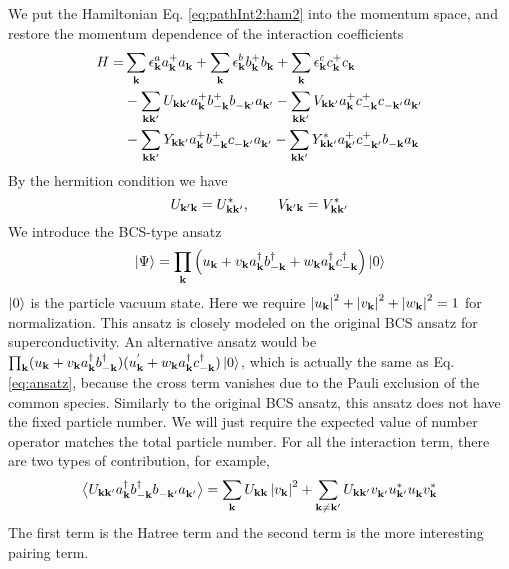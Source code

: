 We put the Hamiltonian Eq. \ref{eq:pathInt2:ham2} into the momentum space, and restore the momentum dependence of the interaction coefficients
\begin{equation}\label{eq:uvw:hamiltonian}
\begin{split}
 H=&\sum_{\mathbf{k}}\epsilon^a_{\mathbf{k}}{}a^+_{\mathbf{k}}{}a^{}_{\mathbf{k}}+\sum_{\mathbf{k}}\epsilon^b_{\mathbf{k}}{}b^+_{\mathbf{k}}{}b^{}_{\mathbf{k}}+\sum_{\mathbf{k}}\epsilon^c_{\mathbf{k}}{}c^+_{\mathbf{k}}{}c^{}_{\mathbf{k}}\\
  &-\sum_{\mathbf{k}\mathbf{k}'}U_{\mathbf{k}\mathbf{k}'}a^+_{\mathbf{k}}{}b^+_{-\mathbf{k}}{}b^{}_{-\mathbf{k}'}a^{}_{\mathbf{k}'}
	-\sum_{\mathbf{k}\mathbf{k}'}V_{\mathbf{k}\mathbf{k}'}a^+_{\mathbf{k}}{}c^+_{-\mathbf{k}}{}c^{}_{-\mathbf{k}'}a^{}_{\mathbf{k}'}\\
 &-\sum_{\mathbf{k}\mathbf{k}'}Y_{\mathbf{k}\mathbf{k}'}a^+_{\mathbf{k}}{}b^+_{-\mathbf{k}}{}c^{}_{-\mathbf{k}'}a^{}_{\mathbf{k}'}
	-\sum_{\mathbf{k}\mathbf{k}'}Y^*_{\mathbf{k}\mathbf{k}'}a^+_{\mathbf{k}'}{}c^+_{-\mathbf{k}'}{}b^{}_{-\mathbf{k}}a^{}_{\mathbf{k}}
\end{split} 
\end{equation}
By the hermition condition we have 
\begin{equation}
 U_{\mathbf{k}'\mathbf{k}}=U^*_{\mathbf{k}\mathbf{k}'},\qquad{} V_{\mathbf{k}'\mathbf{k}}=V^*_{\mathbf{k}\mathbf{k}'}
\end{equation}
  We introduce the BCS-type ansatz 
\begin{equation}\label{eq:ansatz}
 \left|\Psi\right>=\prod_{\mathbf{k}}\left(u_{\mathbf{k}}+v_{\mathbf{k}}{}a^{\dagger}_{\mathbf{k}}{}b^{\dagger}_{-\mathbf{k}}+w_{\mathbf{k}}{}a^{\dagger}_{\mathbf{k}}{}c^{\dagger}_{-\mathbf{k}}\right)\left|0\right>
\end{equation}
$\left|0\right>$ is the particle vacuum state.  Here we require $\left\lvert{u_{\ensuremath{\mathbf{k}}}}\right\rvert^2+\left\lvert{v_{\ensuremath{\mathbf{k}}}}\right\rvert^2+\left\lvert{w_{\ensuremath{\mathbf{k}}}}\right\rvert^2=1$ for normalization.  This ansatz is closely modeled on the original BCS ansatz for superconductivity.  An alternative ansatz would be $\prod_{\mathbf{k}}(u_{\mathbf{k}}+v_{\mathbf{k}}{}a^{\dagger}_{\mathbf{k}}{}b^{\dagger}_{-\mathbf{k}})(u^{'}_{\mathbf{k}}+w_{\mathbf{k}}{}a^{\dagger}_{\mathbf{k}}{}c^{\dagger}_{-\mathbf{k}})\left|0\right>$, which is actually the same as Eq. \ref{eq:ansatz}, because  the cross term vanishes due to the Pauli exclusion of the common species.   Similarly to the original BCS ansatz, this ansatz does not have the fixed particle number.  We  will just require the expected value of number operator matches the total particle number. For all the interaction term, there are two types of contribution,
for example, 
\begin{equation*}
\bigl<{U_{\mathbf{k}\mathbf{k}'}a^{\dagger}_{\mathbf{k}}{}b^{\dagger}_{-\mathbf{k}}{}b^{}_{-\mathbf{k}'}a^{}_{\mathbf{k}'}}\bigr>
=\sum_{\mathbf{k}}U_{\mathbf{k}\mathbf{k}}\left\lvert{v_{\ensuremath{\mathbf{k}}}}\right\rvert^2+\sum_{\mathbf{k}\neq\mathbf{k}'}U_{\mathbf{k}\mathbf{k}'}v^{}_{\mathbf{k}'}u^*_{\mathbf{k}'}u^{}_{\mathbf{k}}{}v^*_{\mathbf{k}}
\end{equation*}
The first term is the Hatree term and the second term is the more interesting pairing term.  


